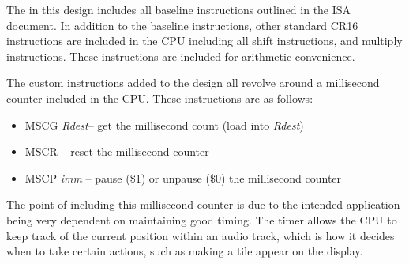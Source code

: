 \documentclass{subfile}
\begin{document}
  The in this design includes all baseline instructions outlined in the ISA document. 
  In addition to the baseline instructions, other standard CR16 instructions are 
  included in the CPU including all shift instructions, and multiply instructions. 
  These instructions are included for arithmetic convenience.

  The custom instructions added to the design all revolve around a millisecond counter 
  included in the CPU.
  These instructions are as follows: 
  \begin{itemize}
    \item MSCG \textit{Rdest}-- get the millisecond count (load into \textit{Rdest})
    \item MSCR -- reset the millisecond counter
    \item MSCP \textit{imm} -- pause (\$1) or unpause (\$0) the millisecond counter
  \end{itemize}

  The point of including this millisecond counter is due to the intended application being
  very dependent on maintaining good timing. 
  The timer allows the CPU to keep track of the current position within an audio track, 
  which is how it decides when to take certain actions, such as making a tile appear on 
  the display.
\end{document}
